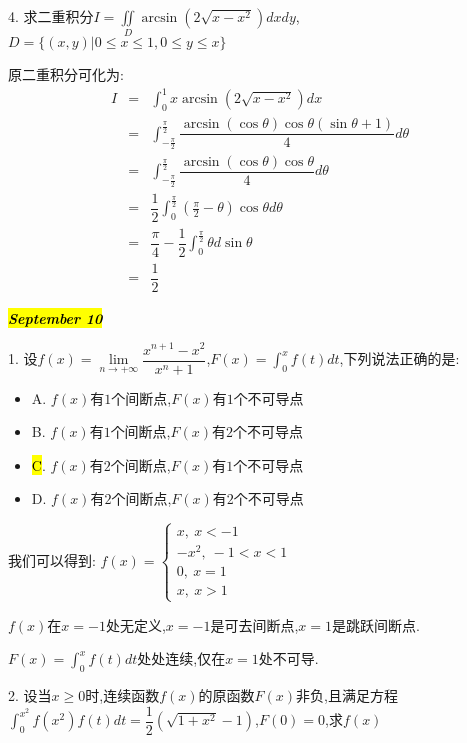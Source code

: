 4. 求二重积分$I=\iint\limits_{D}\arcsin(2\sqrt{x-x^2})dxdy$,$D=\{(x,y)|0\leq x\leq 1,0\leq y\leq x\}$

\begin{solution}

	原二重积分可化为:  
	\begin{eqnarray*}
		I&=&\int_{0}^{1}x\arcsin(2\sqrt{x-x^2})dx\\
		&=&\int_{-\frac{\pi}{2}}^{\frac{\pi}{2}}\dfrac{\arcsin(\cos\theta) \cos\theta(\sin\theta+1)}{4}d\theta\\
		&=&\int_{-\frac{\pi}{2}}^{\frac{\pi}{2}}\dfrac{\arcsin(\cos\theta)\cos\theta}{4}d\theta\\
		&=&\dfrac{1}{2}\int_{0}^{\frac{\pi}{2}}(\frac{\pi}{2}-\theta)\cos\theta d\theta\\
		&=&\dfrac{\pi}{4}-\dfrac{1}{2}\int_{0}^{\frac{\pi}{2}}\theta d\sin\theta\\
		&=&\dfrac{1}{2}
	\end{eqnarray*}
\end{solution}

\hl{\textbf{\textit{September 10}}}

1. 设$f(x)=\lim\limits_{n\rightarrow+\infty}\dfrac{x^{n+1}-x^2}{x^n+1}$,$F(x)=\int_{0}^{x}f(t)dt$,下列说法正确的是:  
\begin{itemize}
	\item A. $f(x)$有$1$个间断点,$F(x)$有$1$个不可导点
	\item B. $f(x)$有$1$个间断点,$F(x)$有$2$个不可导点
	\item \hl{C}. $f(x)$有$2$个间断点,$F(x)$有$1$个不可导点
	\item D. $f(x)$有$2$个间断点,$F(x)$有$2$个不可导点
\end{itemize}
\begin{solution}

	我们可以得到:  $f(x)=\left\lbrace
	\begin{array}{l}
		x,\ x<-1\\
		-x^2,\ -1<x<1\\
		0,\ x=1\\
		x,\ x>1
	\end{array}
	\right. $
	
	$f(x)$在$x=-1$处无定义,$x=-1$是可去间断点,$x=1$是跳跃间断点.
	
	$F(x)=\int_{0}^{x}f(t)dt$处处连续,仅在$x=1$处不可导.
\end{solution}

2. 设当$x\geq 0$时,连续函数$f(x)$的原函数$F(x)$非负,且满足方程$\int_{0}^{x^2}f(x^2)f(t)dt=\dfrac{1}{2}(\sqrt{1+x^2}-1)$,$F(0)=0$,求$f(x)$

